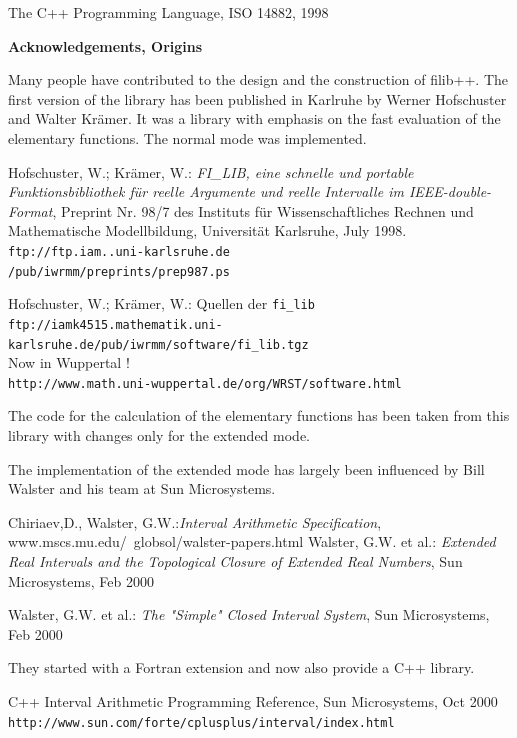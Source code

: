 \documentclass{report}
\newcommand{\url}[1]{{\small\texttt{#1}}}
\begin{document}
\begin{thebibliography}{99}
 The C++ Programming Language,  ISO 14882, 1998 

{\LARGE \textbf{ Acknowledgements, Origins }}

Many people have contributed to the design and the construction of 
filib++. The first version of the library has been published in
Karlruhe by Werner Hofschuster and  Walter Kr\"amer. It was a library with
emphasis on the fast evaluation of the elementary functions. The normal
mode was implemented. 

Hofschuster, W.; Kr\"amer, W.: \emph{FI\_LIB, eine
schnelle und portable Funktionsbibliothek f\"ur reelle Argumente und
reelle Intervalle im IEEE-double-Format}, Preprint Nr. 98/7 des
Instituts f\"ur Wissenschaftliches Rechnen und Mathematische
Modellbildung, Universit\"at Karlsruhe, July 1998. 
\url{ftp://ftp.iam..uni-karlsruhe.de}\\
\url{/pub/iwrmm/preprints/prep987.ps}

Hofschuster, W.; Kr\"amer, W.: Quellen der
\texttt{fi\_lib}\\
\url{ftp://iamk4515.mathematik.uni-karlsruhe.de/pub/iwrmm/software/fi\_lib.tgz}\\
Now in Wuppertal ! \\
\url{http://www.math.uni-wuppertal.de/org/WRST/software.html}

The code for the calculation of the elementary
functions has been taken from this library with changes only for the
extended mode.

The implementation of the extended mode has largely been influenced by
Bill Walster and his team at Sun Microsystems.

 Chiriaev,D., Walster, G.W.:\emph{Interval Arithmetic
Specification},\\ www.mscs.mu.edu/~globsol/walster-papers.html
 Walster, G.W. et al.: \emph{Extended Real Intervals and the
Topological Closure of Extended Real Numbers}, Sun Microsystems, Feb
2000

 Walster, G.W. et al.: \emph{The "Simple" Closed
Interval System}, Sun Microsystems, Feb 2000

They started with a Fortran extension and now also provide a C++
library.

C++ Interval Arithmetic Programming Reference, Sun
Microsystems, Oct 2000 \url{http://www.sun.com/forte/cplusplus/interval/index.html}


\end{thebibliography}
\end{document}
